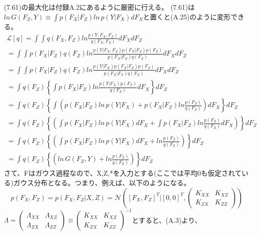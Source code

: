 \documentclass{jsarticle}
\begin{document}
(7.61)の最大化は付録A.2にあるように厳密に行える。
(7.61)は$ln \, G(F_Z, Y) \equiv \int p(F_X | F_Z) ln \, p(Y | F_X) dF_X$と置くと(A.25)のように変形できる。
\begin{equation}
\begin{split}
\mathcal{L}[q] = \int \int q(F_X, F_Z) ln \frac{p(Y, F_X, F_Z)}{q(F_X, F_Z)} dF_X dF_Z\\
= \int \int p(F_X | F_Z)q(F_Z) ln \frac{p(Y | F_X, F_Z)p(F_X | F_Z)p(F_Z)}{p(F_X | F_Z)q(F_Z)} dF_X dF_Z\\
= \int \int p(F_X | F_Z)q(F_Z) ln \frac{p(Y | F_X)p(F_X | F_Z)p(F_Z)}{p(F_X | F_Z)q(F_Z)} dF_X dF_Z\\
= \int q(F_Z)  \left\{ \int p(F_X | F_Z) ln \frac{p(Y | F_X)p(F_Z)}{q(F_Z)} dF_X \right\} dF_Z\\
= \int q(F_Z)  \left\{ \int \left( p(F_X | F_Z) ln \, p(Y | F_X) + p(F_X | F_Z) ln \frac{p(F_Z)}{q(F_Z)}\right) dF_X \right\} dF_Z\\
= \int q(F_Z)  \left\{ \left( \int p(F_X | F_Z) ln \, p(Y | F_X) dF_X + \int p(F_X | F_Z) ln \frac{p(F_Z)}{q(F_Z)}dF_X \right) \right\} dF_Z\\
= \int q(F_Z)  \left\{ \left( \int p(F_X | F_Z) ln \, p(Y | F_X) dF_X + ln \frac{p(F_Z)}{q(F_Z)} \right) \right\} dF_Z\\
= \int q(F_Z)  \left\{ \left( ln \, G(F_Z, Y) + ln \frac{p(F_Z)}{q(F_Z)} \right) \right\} dF_Z
\end{split}
\end{equation}
さて、Fはガウス過程なので、X,Z,*を入力とする(ここでは平均0も仮定されている)ガウス分布となる。つまり、例えば、以下のようになる。
\begin{equation}
p(F_X, F_Z) = p(F_X, F_Z | X, Z) = \mathcal{N}([F_X, F_Z]^T | [0, 0]^T, 
\begin{pmatrix}
K_{XX} & K_{XZ}\\
K_{ZX} & K_{ZZ} 
\end{pmatrix}
)
\end{equation}
$\Lambda = \begin{pmatrix}
\Lambda_{XX} & \Lambda_{XZ}\\
\Lambda_{ZX} & \Lambda_{ZZ} 
\end{pmatrix}
\equiv \begin{pmatrix}
K_{XX} & K_{XZ}\\
K_{ZX} & K_{ZZ} 
\end{pmatrix}^{-1}
$とすると、(A.3)より、
\end{document}
